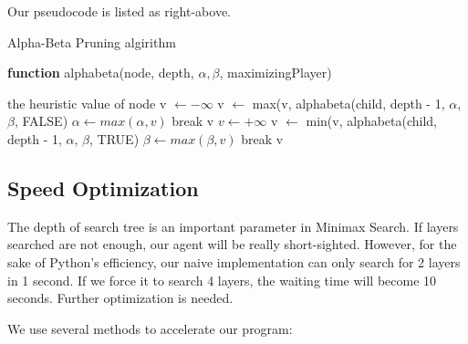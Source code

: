 \documentclass[12pt,a4paper]{article}
\begin{document}
Our pseudocode is listed as right-above.
\begin{small}
\begin{algorithm}[!h]
\caption{Alpha-Beta Pruning algirithm}
\hspace*{0.02in} {\bf function}
alphabeta(node, depth, $\alpha, \beta$, maximizingPlayer)
\begin{algorithmic}
	\State \Return the heuristic value of node
		\State v $\gets - \infty$
			\State v $\gets$ max(v, alphabeta(child, depth - 1, $\alpha$, $\beta$, FALSE)
			\State $\alpha \gets max(\alpha, v)$
			\If{$\beta \leq \alpha$}
				\State break
			\EndIf
		\State \Return v
		\EndFor
	\Else
		\State $v \gets + \infty$
			\State v $\gets$ min(v, alphabeta(child, depth - 1, $\alpha$, $\beta$, TRUE)
			\State $\beta \gets max(\beta, v)$
			\If{$\beta \leq \alpha$}
				\State break
			\EndIf
		\State \Return v
		\EndFor
	\EndIf
\EndIf
\end{algorithmic}
\end{algorithm}
\end{small}

\subsection{Speed Optimization}
The depth of search tree is an important parameter in Minimax Search. If layers searched are not enough, our agent will be really short-sighted. However, for the sake of Python's efficiency, our naive implementation can only search for 2 layers in 1 second. If we force it to search 4 layers, the waiting time will become 10 seconds. Further optimization is needed.

We use several methods to accelerate our program:
\end{document}
